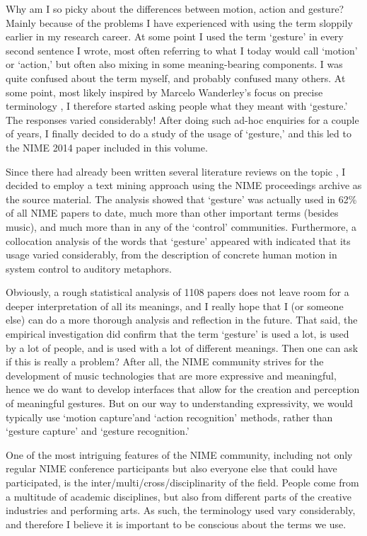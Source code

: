 Why am I so picky about the differences between motion, action and gesture? Mainly because of the problems I have experienced with using the term sloppily earlier in my research career. At some point I used the term `gesture' in every second sentence I wrote, most often referring to what I today would call `motion' or `action,' but often also mixing in some meaning-bearing components. I was quite confused about the term myself, and probably confused many others. At some point, most likely inspired by Marcelo Wanderley's focus on precise terminology \cite{Cadoz:2000}, I therefore started asking people what they meant with `gesture.' The responses varied considerably! After doing such ad-hoc enquiries for a couple of years, I finally decided to do a study of the usage of `gesture,' and this led to the NIME 2014 paper included in this volume.

Since there had already been written several literature reviews on the topic \cite{Cadoz:2000,Jensenius:2010}, I decided to employ a text mining approach using the NIME proceedings archive as the source material. The analysis showed that `gesture' was actually used in 62\% of all NIME papers to date, much more than other important terms (besides music), and much more than in any of the `control' communities. Furthermore, a collocation analysis of the words that `gesture' appeared with indicated that its usage varied considerably, from the description of concrete human motion in system control to auditory metaphors.

Obviously, a rough statistical analysis of 1108 papers does not leave room for a deeper interpretation of all its meanings, and I really hope that I (or someone else) can do a more thorough analysis and reflection in the future. That said, the empirical investigation did confirm that the term `gesture' is used a lot, is used by a lot of people, and is used with a lot of different meanings. Then one can ask if this is really a problem? After all, the NIME community strives for the development of music technologies that are more expressive and meaningful, hence we do want to develop interfaces that allow for the creation and perception of meaningful gestures. But on our way to understanding expressivity, we would typically use `motion capture'and `action recognition' methods, rather than `gesture capture' and `gesture recognition.'

One of the most intriguing features of the NIME community, including not only regular NIME conference participants but also everyone else that could have participated, is the inter/multi/cross/disciplinarity of the field. People come from a multitude of academic disciplines, but also from different parts of the creative industries and performing arts. As such, the terminology used vary considerably, and therefore I believe it is important to be conscious about the terms we use.

